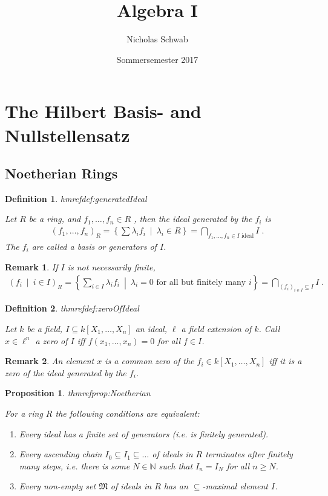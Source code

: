 \documentclass[DIV=14,parskip=full,pointednumbers]{scrartcl}
\title{Algebra I}
\author{Nicholas Schwab}
\date{Sommersemester 2017}
\newenvironment{rmnumerate}{\begin{enumerate}[label={\upshape(\roman*)}]}{\end{enumerate}}
\theoremstyle{cthm}
\newtheorem{prop}{Proposition}[subsection]
\theoremstyle{cdef}
\newtheorem{defi}{Definition}[subsection]
\newtheorem{rem}{Remark}[subsection]
\newcommand{\lbl}[1]{
	\label{#1}
	\edef\dummy{\curthm}
	\expandafter\xdef\csname thmref#1\endcsname{\dummy}
}
\newcommand{\IN}{\mathbb{N}}
\newcommand{\st}{\ \middle|\ }
\begin{document}
\maketitle
\tableofcontents
\section{The Hilbert Basis- and Nullstellensatz}
\subsection{Noetherian Rings}
\begin{defi}\lbl{def:generatedIdeal}
 Let $R$ be a ring, and $f_1,\ldots, f_n\in R$ , then  the \emph{ideal generated by the $f_i$} is
 \begin{align*}\left( f_1,\ldots,  f_n\right)_R = \left\{\sum\lambda_i f_i\st\lambda_i \in R\right\} = \bigcap_{f_1,\ldots,f_n\in I\text{ ideal}} I\;.
 \end{align*}
The $f_i$ are called a \emph{basis} or \emph{generators} of $I$. 
\end{defi}
\begin{rem}
 If $I$ is not necessarily finite, 
 \begin{align*}
\left( f_i\st i\in I\right)_R = \left\{\sum_{i\in I} \lambda_i f_i \st\lambda_i = 0 \text{ for all but finitely many } i\right\} = \bigcap_{(f_i)_{i\in I}\subseteq I} I\;.
\end{align*}
\end{rem}
\begin{defi}\lbl{def:zeroOfIdeal}
 Let $k$ be a field, $I\subseteq k[X_1,\ldots, X_n]$ an ideal, $\ell$ a field extension of $k$. Call $x\in \ell^n$ a \emph{zero} of $I$ iff $f(x_1,\ldots,x_n) = 0$ for all $f\in I$. 
\end{defi}
\begin{rem}
 An element $x$ is a common zero of the $f_i\in k[X_1,\ldots,X_n]$ iff it is a zero of the ideal generated by the $f_i$.
\end{rem}
\begin{prop}\lbl{prop:Noetherian}
 For a ring $R$ the following conditions are equivalent:
 \begin{rmnumerate}
  \item Every ideal has a finite set of generators (i.e. is finitely generated).
  \item Every ascending chain $I_0 \subseteq I_1 \subseteq \ldots$ of ideals in $R$ terminates after finitely many steps, i.e. there is some $N\in\IN$ such that $I_n=I_N$ for all $n\geq N$.
  \item Every non-empty set $\mathfrak{M}$ of ideals in $R$ has an $\subseteq$-maximal element $I$. 
 \end{rmnumerate}
\end{prop}
\end{document}
